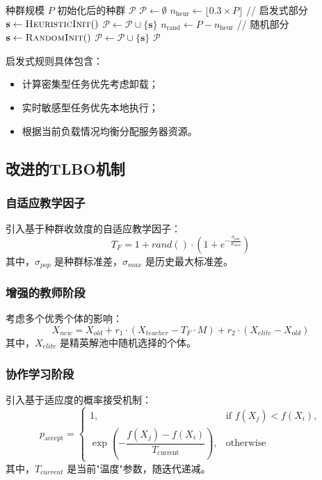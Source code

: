\documentclass[conference]{IEEEtran}
\begin{document}
\begin{algorithm}
  \caption{智能初始化策略}
  \label{alg:intelligent_init}
  \begin{algorithmic}[1]        %
    \REQUIRE 种群规模 $P$
    \ENSURE 初始化后的种群 $\mathcal{P}$
    \STATE $\mathcal{P} \leftarrow \emptyset$
    \STATE $n_{\mathrm{heur}} \leftarrow \lfloor 0.3 \times P \rfloor$  \hfill// 启发式部分
        \STATE $\mathbf{s} \leftarrow \textsc{HeuristicInit}()$
        \STATE $\mathcal{P} \leftarrow \mathcal{P} \cup \{\mathbf{s}\}$
    \ENDFOR
    \STATE $n_{\mathrm{rand}} \leftarrow P - n_{\mathrm{heur}}$        \hfill// 随机部分
        \STATE $\mathbf{s} \leftarrow \textsc{RandomInit}()$
        \STATE $\mathcal{P} \leftarrow \mathcal{P} \cup \{\mathbf{s}\}$
    \ENDFOR
    \RETURN $\mathcal{P}$
  \end{algorithmic}
\end{algorithm}
启发式规则具体包含：
\begin{itemize}
  \item 计算密集型任务优先考虑卸载；
  \item 实时敏感型任务优先本地执行；
  \item 根据当前负载情况均衡分配服务器资源。
\end{itemize}
\subsection{改进的TLBO机制}
\subsubsection{自适应教学因子}
引入基于种群收敛度的自适应教学因子\cite{b14}：
\begin{equation}
T_F = 1 + rand() \cdot \left(1 + e^{-\frac{\sigma_{pop}}{\sigma_{max}}}\right)
\end{equation}
其中，$\sigma_{pop}$ 是种群标准差，$\sigma_{max}$ 是历史最大标准差。
\subsubsection{增强的教师阶段}
考虑多个优秀个体的影响：
\begin{equation}
X_{new} = X_{old} + r_1 \cdot (X_{teacher} - T_F \cdot M) + r_2 \cdot (X_{elite} - X_{old})
\end{equation}
其中，$X_{elite}$ 是精英解池中随机选择的个体。
\subsubsection{协作学习阶段}
引入基于适应度的概率接受机制：
\begin{equation}
p_{\text{accept}} =
\begin{cases}
1, &
\text{if } f(X_j) < f(X_i),\\[4pt]
\displaystyle
\exp\!\left( -\dfrac{f(X_j) - f(X_i)}{T_{\text{current}}} \right), &
\text{otherwise}
\end{cases}
\end{equation}
其中，$T_{current}$ 是当前"温度"参数，随迭代递减。
\end{document}
